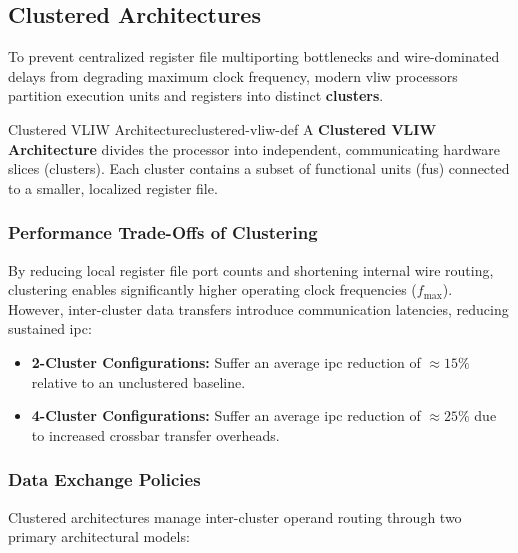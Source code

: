 \subsection{Clustered  Architectures}

To prevent centralized register file multiporting bottlenecks and wire-dominated delays from degrading maximum clock frequency, modern \gls{vliw} processors partition execution units and registers into distinct \textbf{clusters}.

\begin{definition}{Clustered VLIW Architecture}{clustered-vliw-def}
    A \textbf{Clustered VLIW Architecture} divides the processor into independent, communicating hardware slices (clusters). Each cluster contains a subset of functional units (\glspl{fu}) connected to a smaller, localized register file.
\end{definition}

\subsubsection{Performance Trade-Offs of Clustering}
By reducing local register file port counts and shortening internal wire routing, clustering enables significantly higher operating clock frequencies ($f_{\text{max}}$). However, inter-cluster data transfers introduce communication latencies, reducing sustained \gls{ipc}:
\begin{itemize}
    \item \textbf{2-Cluster Configurations:} Suffer an average \gls{ipc} reduction of $\approx 15\%$ relative to an unclustered baseline.
    \item \textbf{4-Cluster Configurations:} Suffer an average \gls{ipc} reduction of $\approx 25\%$ due to increased crossbar transfer overheads.
\end{itemize}

\subsubsection{Data Exchange Policies}
Clustered architectures manage inter-cluster operand routing through two primary architectural models:

